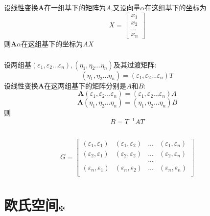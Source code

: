 \documentclass[11pt, a4paper, UTF8]{ctexart}
\begin{document}
\subsubsection{}
设线性变换$\bm A$在一组基下的矩阵为$A$,又设向量$\alpha$在这组基下的坐标为
\[X=\begin{bmatrix}
x_1\\
x_2\\
...\\
x_n
\end{bmatrix}\]
则$\bm A\alpha$在这组基下的坐标为$AX$
\subsubsection{}
设两组基$(\varepsilon_1,\varepsilon_2...\varepsilon_n),(\eta_1,\eta_2...\eta_n)$及其过渡矩阵:
\[(\eta_1,\eta_2...\eta_n)=(\varepsilon_1,\varepsilon_2...\varepsilon_n)T\]
设线性变换$\bm A$在这两组基下的矩阵分别是$A$和$B$:
\[\bm A(\varepsilon_1,\varepsilon_2...\varepsilon_n)=(\varepsilon_1,\varepsilon_2...\varepsilon_n)A\]
\[\bm A(\eta_1,\eta_2...\eta_n)=(\eta_1,\eta_2...\eta_n)B\]
则
\[B=T^{-1}AT\]
\subsection{}
\[G=\begin{bmatrix}
(\varepsilon_1,\varepsilon_1)&(\varepsilon_1,\varepsilon_2)&...&(\varepsilon_1,\varepsilon_n)\\
(\varepsilon_2,\varepsilon_1)&(\varepsilon_2,\varepsilon_2)&...&(\varepsilon_2,\varepsilon_n)\\
&&...&\\
(\varepsilon_n,\varepsilon_1)&(\varepsilon_n,\varepsilon_2)&...&(\varepsilon_n,\varepsilon_n)\\
\end{bmatrix}\]
\section{欧氏空间\protect\hyperlink{catalog}{$\fuck$}}
\end{document}
